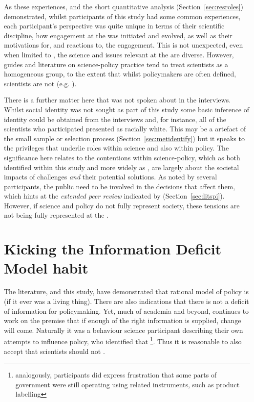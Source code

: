 As these experiences, and the short quantitative analysis (Section~\ref{sec:resroles}) demonstrated, whilst participants of this study had some common experiences, each participant's perspective was quite unique in terms of their scientific discipline, how engagement at the \SPI{} was initiated and evolved, as well as their motivations for, and reactions to, the engagement. This is not unexpected, even when limited to \CAN{}, the science and issues relevant at the \SPI{} are diverse. However, guides and literature on science-policy practice tend to treat scientists as a homogeneous group, to the extent that whilst policymakers are often defined, scientists are not (e.g. \cite{BA2024trust}). 

There is a further matter here that was not spoken about in the interviews. Whilst social identity was not sought as part of this study some basic inference of identity could be obtained from the interviews and, for instance, all of the scientists who participated presented as racially white. This may be a artefact of the small sample or selection process (Section~\ref{sec:metidentify}) but it speaks to the privileges that underlie roles within science and also within policy. The significance here relates to the contentions within \CAN{} science-policy, which as both identified within this study and more widely as \PNS, are largely about the societal impacts of \CAN{} challenges \emph{and} their potential solutions. As noted by several participants, the public need to be involved in the decisions that affect them, which hints at the \emph{extended peer review} indicated by \PNS{} (Section~\ref{sec:litspi}). However, if science and policy do not fully represent society, these tensions are not being fully represented at the \SPI{}. 

\section{Kicking the Information Deficit Model habit}\label{sec:disdeficit}

The literature, and this study, have demonstrated that rational model of policy is  (if it ever was a living thing). There are also indications that there is not a deficit of information for \CAN{} policymaking. Yet, much of academia and beyond, continues to work on the \IDM{} premise that if enough of the right information is supplied, change will come. Naturally it was a behaviour science participant describing their own attempts to influence policy, who identified that \footnote{analogously, participants did express frustration that some parts of government were still operating using related instruments, such as product labelling}. Thus it is reasonable to also accept that scientists should not .

